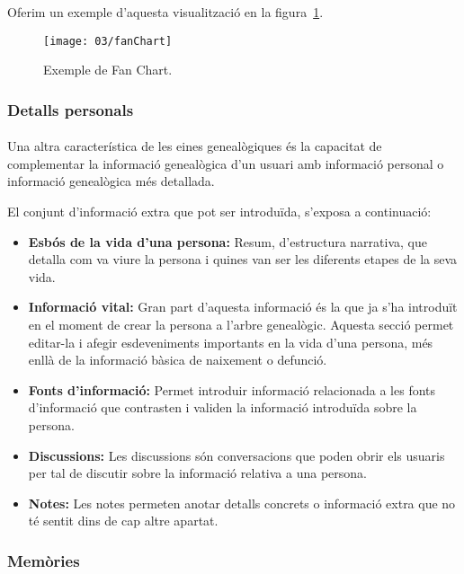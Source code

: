     Oferim un exemple d’aquesta visualització en la figura~\ref{fig:fanChart}.

    \begin{figure}[h]
        \texttt{[image: 03/fanChart]}
        \centering
        \caption{Exemple de Fan Chart.\label{fig:fanChart}}
    \end{figure}


    \subsubsection{Detalls personals}

    \paragraph{}
    Una altra característica de les eines genealògiques és la capacitat de complementar la informació ge\-nea\-lò\-gi\-ca d'un usuari amb informació personal o informació ge\-nea\-lò\-gi\-ca més detallada.

    El conjunt d'informació extra que pot ser introduïda, s'exposa a continuació:

    \begin{itemize}
        \item \textbf{Esbós de la vida d'una persona:} Resum, d’estructura narrativa, que detalla com va viure la persona i quines van ser les diferents etapes de la seva vida.
        \item \textbf{Informació vital:} Gran part d’aquesta informació és la que ja s’ha introduït en el moment de crear la persona a l’arbre genealògic. Aquesta secció permet editar-la i afegir esdeveniments importants en la vida d’una persona, més enllà de la informació bàsica de naixement o defunció.
        \item \textbf{Fonts d’informació:} Permet introduir informació relacionada a les fonts d’informació que contrasten i validen la informació introduïda sobre la persona.
        \item \textbf{Discussions:} Les discussions són conversacions que poden obrir els usuaris per tal de discutir sobre la informació relativa a una persona.
        \item \textbf{Notes:} Les notes permeten anotar detalls concrets o informació extra que no té sentit dins de cap altre apartat.
    \end{itemize}


    \subsubsection{Memòries}

